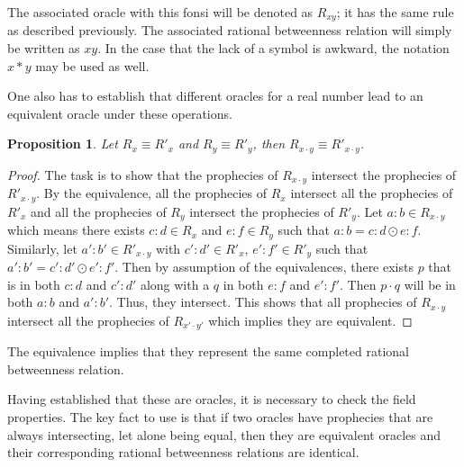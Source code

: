 \documentclass[12pt]{article}
\newtheorem{proposition}{Proposition}[section]
\begin{document}
The associated oracle with this fonsi will be denoted as $R_{xy}$; it has the same rule as described previously. The associated rational betweenness relation will simply be written as $xy$. In the case that the lack of a symbol is awkward, the notation $x * y$ may be used as well. 

One also has to establish that different oracles for a real number lead to an equivalent oracle under these operations. 

\begin{proposition}
    Let $R_x \equiv R'_x$ and $R_y \equiv R'_y$, then $R_{x \cdot y} \equiv R'_{x \cdot y}$.
\end{proposition}

\begin{proof}
The task is to show that the prophecies of $R_{x \cdot y}$ intersect the prophecies of $R'_{x \cdot y}$. By the equivalence, all the prophecies of $R_x$ intersect all the prophecies of $R'_x$ and all the prophecies of $R_y$ intersect the prophecies of $R'_y$. Let $a:b \in R_{x \cdot y}$ which means there exists $c:d \in R_x$ and $e:f \in R_y$ such that $a:b = c:d \odot e:f$. Similarly, let $a':b'\in R'_{x \cdot y}$ with $c':d' \in R'_x$, $e':f' \in R'_y$ such that $a':b' = c':d' \odot e':f'$. Then by assumption of the equivalences, there exists $p$ that is in both $c:d$ and $c':d'$ along with a $q$ in both $e:f$ and $e':f'$. Then $p \cdot q$ will be in both $a:b$ and $a':b'$. Thus, they intersect. This shows that all prophecies of $R_{x \cdot y}$ intersect all the prophecies of $R_{x' \cdot y'}$ which implies they are equivalent. 
\end{proof}

The equivalence implies that they represent the same completed rational betweenness relation.

Having established that these are oracles, it is necessary to check the field properties. The key fact to use is that if two oracles have prophecies that are always intersecting, let alone being equal, then they are equivalent oracles and their corresponding rational betweenness relations are identical. 
\end{document}
